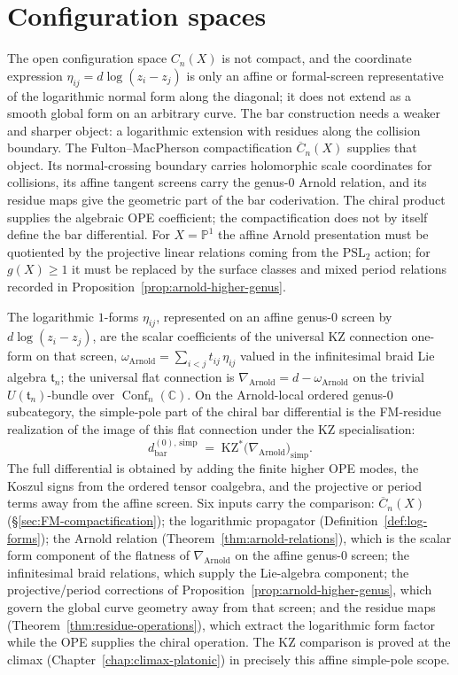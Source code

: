 \chapter{Configuration spaces}
\label{chap:config-spaces}

The open configuration space $C_n(X)$ is not compact, and the
coordinate expression \(\eta_{ij}=d\log(z_i-z_j)\) is only an affine or
formal-screen representative of the logarithmic normal form along the
diagonal; it does not extend as a smooth global form on an arbitrary
curve. The bar construction needs a weaker and sharper object: a
logarithmic extension with residues along the collision boundary. The
Fulton--MacPherson compactification $\overline C_n(X)$ supplies that
object. Its normal-crossing boundary carries holomorphic scale
coordinates for collisions, its affine tangent screens carry the
genus-$0$ Arnold relation, and its residue maps give the geometric
part of the bar coderivation. The chiral product supplies the
algebraic OPE coefficient; the compactification does not by itself
define the bar differential. For $X=\mathbb P^1$ the affine Arnold
presentation must be quotiented by the projective linear relations
coming from the $\mathrm{PSL}_2$ action; for $g(X)\geq1$ it must be
replaced by the surface classes and mixed period relations recorded in
Proposition~\ref{prop:arnold-higher-genus}.

The logarithmic \(1\)-forms \(\eta_{ij}\), represented on an affine
genus-$0$ screen by \(d\log(z_i-z_j)\), are the scalar coefficients of
the universal KZ connection one-form on that screen,
$\omega_{\mathrm{Arnold}} = \sum_{i<j} t_{ij}\,\eta_{ij}$ valued in
the infinitesimal braid Lie algebra $\mathfrak{t}_n$; the
universal flat connection is
$\nabla_{\mathrm{Arnold}} = d - \omega_{\mathrm{Arnold}}$ on the
trivial $U(\mathfrak t_n)$-bundle over
$\operatorname{Conf}_n(\mathbb C)$. On the Arnold-local ordered
genus-$0$ subcategory, the simple-pole part of the chiral bar
differential is the FM-residue realization of the image of this flat
connection under the KZ specialisation:
\[
 d_{\mathrm{bar}}^{(0),\,\mathrm{simp}}
 \;=\;
 \mathrm{KZ}^{*}\bigl(\nabla_{\mathrm{Arnold}}\bigr)_{\mathrm{simp}} .
\]
The full differential is obtained by adding the finite higher OPE
modes, the Koszul signs from the ordered tensor coalgebra, and the
projective or period terms away from the affine screen. Six inputs
carry the comparison: $\overline{C}_n(X)$
(\S\ref{sec:FM-compactification}); the logarithmic propagator
(Definition~\ref{def:log-forms}); the Arnold relation
(Theorem~\ref{thm:arnold-relations}), which is the scalar form
component of the flatness of $\nabla_{\mathrm{Arnold}}$ on the affine
genus-$0$ screen; the infinitesimal braid relations, which supply the
Lie-algebra component; the
projective/period corrections of
Proposition~\ref{prop:arnold-higher-genus}, which govern the global
curve geometry away from that screen; and the residue maps
(Theorem~\ref{thm:residue-operations}), which extract the logarithmic
form factor while the OPE supplies the chiral operation. The KZ
comparison is proved at the climax
(Chapter~\ref{chap:climax-platonic}) in precisely this affine
simple-pole scope.

